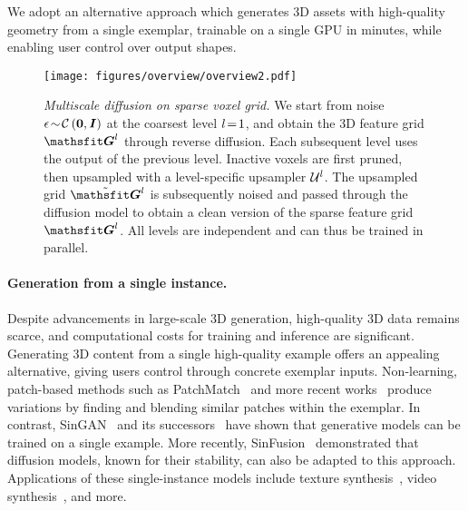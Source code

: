 We adopt an alternative approach which generates 3D assets with high-quality geometry from a single exemplar, trainable on a single GPU in minutes, while enabling user control over output shapes.

\begin{figure}[!t]
    \texttt{[image: figures/overview/overview2.pdf]}\vspace*{-4mm}
    \caption{\emph{Multiscale diffusion on sparse voxel grid.} We start from noise \({\mathbf{\epsilon}}\!\sim\!\mathcal{C}\left( {\bm{0}},{\bm{I}} \right)\) at the coarsest level \(l\!=\!1\), and obtain the 3D feature grid \(\grid^{\lvl}\) through reverse diffusion. Each subsequent level uses the output of the previous level. Inactive voxels are first pruned, then upsampled with a level-specific upsampler \(\mathcal{U}^{l}\). The upsampled grid \(\blurredGrid{\vphantom{\grid}}^{\lvl}\) is subsequently noised and passed through the diffusion model to obtain a clean version of the sparse feature grid \(\grid^{\lvl}\). All levels are independent and can thus be trained in parallel. \vspace*{-5mm}} \label{fig:overview}
\end{figure}

\vspace*{-5mm}
\paragraph{Generation from a single instance.}
Despite advancements in large-scale 3D generation, high-quality 3D data remains scarce, and computational costs for training and inference are significant. Generating 3D content from a single high-quality example offers an appealing alternative, giving users control through concrete exemplar inputs. Non-learning, patch-based methods such as PatchMatch~\cite{han2008multiscale,barnes2009patchmatch} and more recent works~\cite{granot2022drop, elnekave2022generating} produce variations by finding and blending similar patches within the exemplar.
In contrast, SinGAN~\cite{shaham2019singan} and its successors~\cite{shocher2019ingan, hinz2021improved} have shown that generative models can be trained on a single example. More recently, SinFusion~\cite{nikankin2023sinfusion, kulikov2023sinddm} demonstrated that diffusion models, known for their stability, can also be adapted to this approach. Applications of these single-instance models include texture synthesis~\cite{zhou2018non, niklasson2021self, rodriguez2022seamlessgan, Mitchel_2024_CVPR}, video synthesis~\cite{haim2022diverse}, and more.

